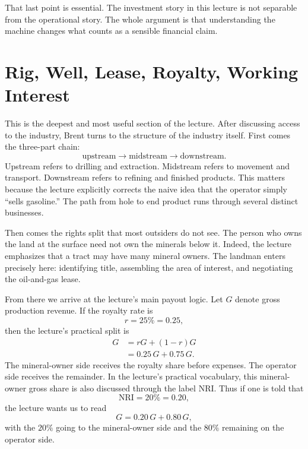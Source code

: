 That last point is essential. The investment story in this lecture is not separable from the operational story. The whole argument is that understanding the machine changes what counts as a sensible financial claim.

\section{Rig, Well, Lease, Royalty, Working Interest}

This is the deepest and most useful section of the lecture. After discussing access to the industry, Brent turns to the structure of the industry itself. First comes the three-part chain:
\begin{equation}
\text{upstream} \longrightarrow \text{midstream} \longrightarrow \text{downstream}.
\end{equation}
Upstream refers to drilling and extraction. Midstream refers to movement and transport. Downstream refers to refining and finished products. This matters because the lecture explicitly corrects the naive idea that the operator simply ``sells gasoline.'' The path from hole to end product runs through several distinct businesses.

Then comes the rights split that most outsiders do not see. The person who owns the land at the surface need not own the minerals below it. Indeed, the lecture emphasizes that a tract may have many mineral owners. The landman enters precisely here: identifying title, assembling the area of interest, and negotiating the oil-and-gas lease.

From there we arrive at the lecture's main payout logic. Let \(G\) denote gross production revenue. If the royalty rate is
\begin{equation}
r = 25\% = 0.25,
\end{equation}
then the lecture's practical split is
\begin{align}
G &= rG + (1-r)G \\
  &= 0.25\,G + 0.75\,G.
\end{align}
The mineral-owner side receives the royalty share before expenses. The operator side receives the remainder. In the lecture's practical vocabulary, this mineral-owner gross share is also discussed through the label NRI. Thus if one is told that
\begin{equation}
\mathrm{NRI} = 20\% = 0.20,
\end{equation}
the lecture wants us to read
\begin{equation}
G = 0.20\,G + 0.80\,G,
\end{equation}
with the \(20\%\) going to the mineral-owner side and the \(80\%\) remaining on the operator side.

